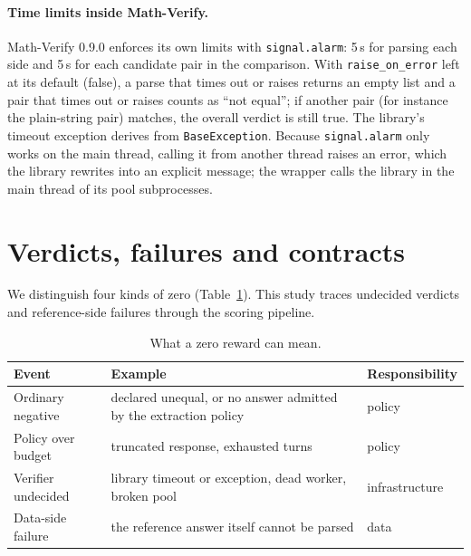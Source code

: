 \documentclass[10pt,a4paper]{article}
\newcommand{\mv}{Math-Verify}
\begin{document}
\paragraph{Time limits inside \mv{}.}
\mv{} 0.9.0 enforces its own limits with \texttt{signal.alarm}: 5\,s for
parsing each side and 5\,s for each candidate pair in the comparison. With
\texttt{raise\_on\_error} left at its default (false), a parse that times out or raises
returns an empty list and a pair that times out or raises counts as
``not equal''; if another pair (for instance the plain-string pair) matches,
the overall verdict is still true. The library's timeout exception derives
from \texttt{BaseException}. Because \texttt{signal.alarm} only works on
the main thread, calling it from another thread raises an error, which the
library rewrites into an explicit message; the wrapper calls the library in
the main thread of its pool subprocesses.

\section{Verdicts, failures and contracts}
\label{sec:contracts}

We distinguish four kinds of zero (Table~\ref{tab:events}). This study traces
undecided verdicts and reference-side failures through the scoring pipeline.

\begin{table}[h]
\centering
\caption{What a zero reward can mean.}
\label{tab:events}
\small
\begin{tabular}{@{}p{3.4cm}p{6.3cm}l@{}}
\toprule
Event & Example & Responsibility \\
\midrule
Ordinary negative & declared unequal, or no answer admitted by the extraction policy & policy \\
Policy over budget & truncated response, exhausted turns & policy \\
Verifier undecided & library timeout or exception, dead worker, broken pool & infrastructure \\
Data-side failure & the reference answer itself cannot be parsed & data \\
\bottomrule
\end{tabular}
\end{table}
\end{document}
